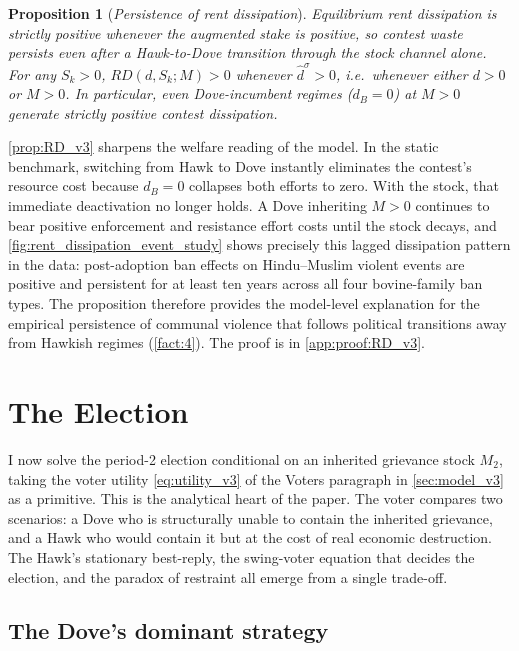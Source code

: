 \documentclass[11pt,twoside]{extarticle}
\newtheorem{proposition}{Proposition}
\begin{document}
\begin{proposition}[\emph{Persistence of rent dissipation}]\label{prop:RD_v3}
\emph{Equilibrium rent dissipation is strictly positive whenever the augmented stake is positive, so contest waste persists even after a Hawk-to-Dove transition through the stock channel alone.}
For any $S_k>0$, $RD(d,S_k;M)>0$ whenever $\hat d^\sigma>0$, i.e.\ whenever either $d>0$ or $M>0$. In particular, even Dove-incumbent regimes ($d_B=0$) at $M>0$ generate strictly positive contest dissipation.
\end{proposition}

\autoref{prop:RD_v3} sharpens the welfare reading of the model. In the static benchmark, switching from Hawk to Dove instantly eliminates the contest's resource cost because $d_B=0$ collapses both efforts to zero. With the stock, that immediate deactivation no longer holds. A Dove inheriting $M>0$ continues to bear positive enforcement and resistance effort costs until the stock decays, and \autoref{fig:rent_dissipation_event_study} shows precisely this lagged dissipation pattern in the data: post-adoption ban effects on Hindu--Muslim violent events are positive and persistent for at least ten years across all four bovine-family ban types. The proposition therefore provides the model-level explanation for the empirical persistence of communal violence that follows political transitions away from Hawkish regimes (\autoref{fact:4}). The proof is in \autoref{app:proof:RD_v3}.

\section{The Election}\label{sec:block2}

I now solve the period-2 election conditional on an inherited grievance stock $M_2$, taking the voter utility \autoref{eq:utility_v3} of the Voters paragraph in \autoref{sec:model_v3} as a primitive. This is the analytical heart of the paper. The voter compares two scenarios: a Dove who is structurally unable to contain the inherited grievance, and a Hawk who would contain it but at the cost of real economic destruction. The Hawk's stationary best-reply, the swing-voter equation that decides the election, and the paradox of restraint all emerge from a single trade-off.

\subsection{The Dove's dominant strategy}\label{subsec:dove_v3}
\end{document}

